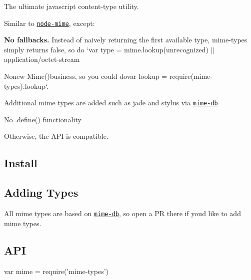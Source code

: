 \href{https://npmjs.org/package/mime-types}{\tt } \href{https://npmjs.org/package/mime-types}{\tt } \href{https://nodejs.org/en/download/}{\tt } \href{https://travis-ci.org/jshttp/mime-types}{\tt } \href{https://coveralls.io/r/jshttp/mime-types}{\tt }

The ultimate javascript content-\/type utility.

Similar to \href{https://github.com/broofa/node-mime}{\tt node-\/mime}, except\+:


\begin{DoxyItemize}
\item {\bfseries No fallbacks.} Instead of naively returning the first available type, {\ttfamily mime-\/types} simply returns {\ttfamily false}, so do `var type = mime.\+lookup(\textquotesingle{}unrecognized\textquotesingle{}) $\vert$$\vert$ \textquotesingle{}application/octet-\/stream
\item {\ttfamily No}new Mime(){\ttfamily business, so you could do}var lookup = require(\textquotesingle{}mime-\/types\textquotesingle{}).lookup`.
\item Additional mime types are added such as jade and stylus via \href{https://github.com/jshttp/mime-db}{\tt mime-\/db}
\item No {\ttfamily .define()} functionality
\end{DoxyItemize}

Otherwise, the A\+PI is compatible.

\subsection*{Install}




\subsection*{Adding Types}

All mime types are based on \href{https://github.com/jshttp/mime-db}{\tt mime-\/db}, so open a PR there if you\textquotesingle{}d like to add mime types.

\subsection*{A\+PI}


\begin{DoxyCode}
var mime = require('mime-types')
\end{DoxyCode}



